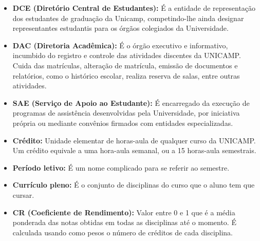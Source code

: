 \begin{itemize}
\item  \textbf{DCE (Diretório Central de Estudantes):} É a entidade de representação dos estudantes de graduação da Unicamp, competindo-lhe ainda designar representantes estudantis para os órgãos colegiados da Universidade.
\end{itemize}

\begin{itemize}
\item  \textbf{DAC (Diretoria Acadêmica):} É o órgão executivo e informativo, incumbido do registro e controle das atividades discentes da UNICAMP. Cuida das matrículas, alteração de matrícula, emissão de documentos e relatórios, como o histórico escolar, realiza reserva de salas, entre outras atividades.
\end{itemize}

\begin{itemize}
\item  \textbf{SAE (Serviço de Apoio ao Estudante):} É encarregado da execução de programas de assistência desenvolvidas pela Universidade, por iniciativa própria ou mediante convênios firmados com entidades especializadas.
\end{itemize}

\begin{itemize}
\item  \textbf{Crédito:} Unidade elementar de horas-aula de qualquer curso da UNICAMP. Um crédito equivale a uma hora-aula semanal, ou a 15 horas-aula semestrais.
\end{itemize}

\begin{itemize}
\item  \textbf{Período letivo:} É um nome complicado para se referir ao semestre.
\end{itemize}

\begin{itemize}
\item  \textbf{Currículo pleno:} É o conjunto de disciplinas do curso que o aluno tem que cursar.
\end{itemize}

\begin{itemize}
\item  \textbf{CR (Coeficiente de Rendimento):} Valor entre 0 e 1 que é a média ponderada das notas obtidas em todas as disciplinas até o momento. É calculada usando como pesos o número de créditos de cada disciplina.
\end{itemize}

